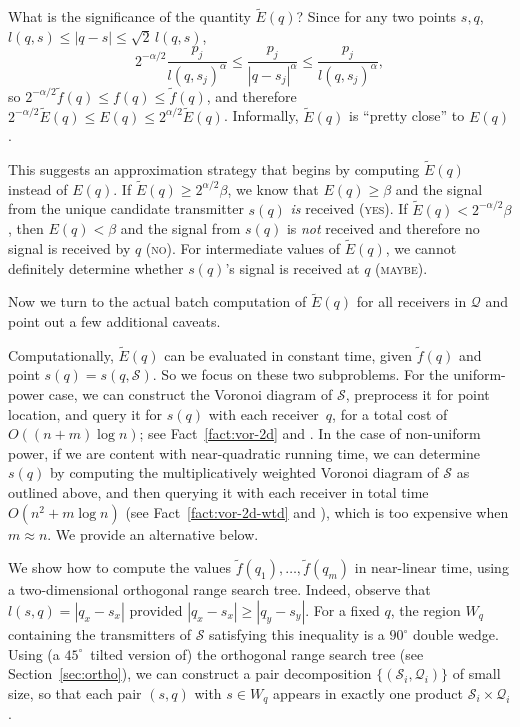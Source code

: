 \documentclass[11pt]{article}
\theoremstyle{remark}
\def\Q{\mathcal{Q}}
\def\S{\mathcal{S}}
\def\ff{\tilde{f}}
\def\EE{\tilde{E}}
\begin{document}
What is the significance of the quantity $\EE(q)$?  Since for any two
points $s,q$, $l(q,s) \leq |q-s| \leq \sqrt{2}\, l(q,s)$, 
\[
2^{-\alpha/2} \frac{p_j}{l(q,s_j)^\alpha} \leq 
\frac{p_j}{|q-s_j|^\alpha} \leq 
\frac{p_j}{l(q,s_j)^\alpha},
\]
so $2^{-\alpha/2}\ff(q)\leq f(q) \leq \ff(q)$, and therefore
$2^{-\alpha/2}\EE(q)\leq E(q) \leq 2^{\alpha/2}\EE(q)$.
Informally, $\EE(q)$ is ``pretty close'' to $E(q)$.  

This suggests an approximation strategy that begins by computing
$\EE(q)$ instead of $E(q)$.  If $\EE(q)\geq 2^{\alpha/2} \beta$, we know that
$E(q)\geq\beta$ and the signal from the unique
candidate transmitter $s(q)$ \emph{is} received (\textsc{yes}).  If $\EE(q)<2^{-\alpha/2}
\beta$, then $E(q)<\beta$ and the signal from $s(q)$ is \emph{not} received
and therefore no signal is received by $q$ (\textsc{no}).  For
intermediate values of $\EE(q)$, we cannot definitely determine whether
$s(q)$'s signal is received at $q$ (\textsc{maybe}). 

Now we turn to the actual batch computation of $\EE(q)$ for all
receivers in $\Q$ and point out a few additional caveats.

Computationally, $\EE(q)$ can be evaluated in constant time, given
$\ff(q)$ and point $s(q)=s(q,\S)$.
So we focus on these two subproblems.
For the uniform-power case, we can construct the Voronoi diagram of $\S$,
preprocess it for point location, and query it for $s(q)$ with each receiver~$q$,
for a total cost of $O((n+m)\log n)$; see Fact~\ref{fact:vor-2d}
and \cite{bcko-cgaa-08}.
In the case of non-uniform power, if we are content with near-quadratic
running time, we can determine $s(q)$ by computing the
multiplicatively weighted Voronoi diagram of $\S$ as outlined above, and
then querying it with each receiver in total time
$O(n^2+m \log n)$ (see Fact~\ref{fact:vor-2d-wtd} and  \cite{bcko-cgaa-08,ae-oacwvdp-84}), which is too expensive when $m \approx n$.  We provide an alternative below.

We show how to compute the values $\ff(q_1), \dots, \ff(q_m)$ in
near-linear time, using a two-dimensional orthogonal range search
tree.  Indeed, observe that $l(s,q)=|q_x - s_x|$ provided $|q_x - s_x|\geq
|q_y - s_y|$.  For a fixed $q$, the region $W_q$ containing the transmitters
of $\S$ satisfying this inequality is a $90^\circ$ double wedge.
Using (a $45^\circ$~tilted version of) the orthogonal range search tree \cite{bcko-cgaa-08}
(see Section~\ref{sec:ortho}), we can construct a pair decomposition
$\{(\S_i,\Q_i)\}$ of small size, so that each pair $(s,q)$ with $s \in
W_q$ appears in exactly one product $\S_i \times \Q_i$.  
\end{document}
